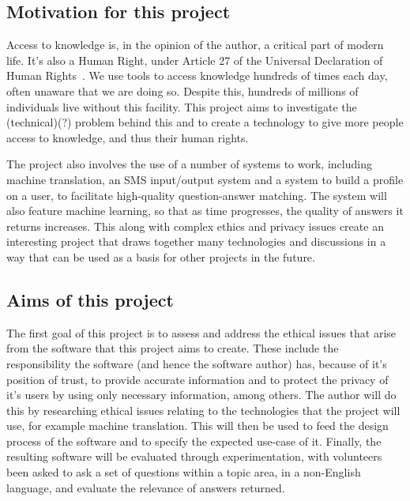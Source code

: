 \documentclass{article}
\begin{document}
\subsection{Motivation for this project}
Access to knowledge is, in the opinion of the author, a critical part of modern life.  It's also a Human Right, under Article 27 of the Universal Declaration of Human Rights~\cite{community1948universal}.  We use tools to access knowledge hundreds of times each day, often unaware that we are doing so.  Despite this, hundreds of millions of individuals live without this facility.  This project aims to investigate the (technical)(?) problem behind this and to create a technology to give more people access to knowledge, and thus their human rights.

The project also involves the use of a number of systems to work, including machine translation, an SMS input/output system and a system to build a profile on a user, to facilitate high-quality question-answer matching.  The system will also feature machine learning, so that as time progresses, the quality of answers it returns increases.  This along with complex ethics and privacy issues create an interesting project that draws together many technologies and discussions in a way that can be used as a basis for other projects in the future.

\subsection{Aims of this project}

The first goal of this project is to assess and address the ethical issues that arise from the software that this project aims to create.  These include the responsibility the software (and hence the software author) has, because of it's position of trust, to provide accurate information and to protect the privacy of it's users by using only necessary information, among others.  The author will do this by researching ethical issues relating to the technologies that the project will use, for example machine translation.  This will then be used to feed the design process of the software and to specify the expected use-case of it.  Finally, the resulting software will be evaluated through experimentation, with volunteers been asked to ask a set of questions within a topic area, in a non-English language, and evaluate the relevance of answers returned.
\end{document}

